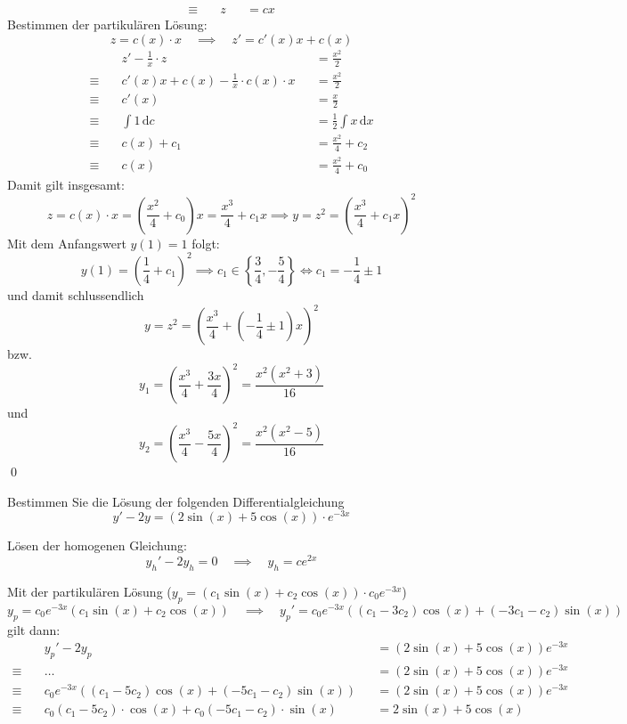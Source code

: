 \documentclass[answers]{exam}
\renewcommand{\d}{\,\mathrm{d}}
\begin{document}
\begin{questions}
\begin{solution}
$$\begin{aligned}
        \equiv \quad & z      &  & = cx
        \end{aligned}
        $$
        Bestimmen der partikulären Lösung: 
        $$
        z = c(x) \cdot x \quad \implies \quad z' = c'(x)x + c(x)
        $$
        $$
        \begin{aligned}
            & z' - \frac{1}{x} \cdot z     &  & = \frac{x^2}{2} \\
            \equiv \quad & c'(x)x + c(x) - \frac{1}{x} \cdot c(x) \cdot x &  & = \frac{x^2}{2} \\
            \equiv \quad & c'(x)  &  & = \frac{x}{2} \\
            \equiv \quad & \int 1 \d c  &  & = \frac{1}{2} \int x \d x\\
            \equiv \quad & c(x) + c_1  &  & = \frac{x^2}{4} + c_2\\
            \equiv \quad & c(x)  &  & = \frac{x^2}{4} + c_0
        \end{aligned}
        $$
        \newpage 
        Damit gilt insgesamt: 
        $$
        z = c(x) \cdot x = \left(\frac{x^2}{4} + c_0\right)x = \frac{x^3}{4} + c_1x \implies y = z^2 = \left(\frac{x^3}{4} + c_1x\right)^2
        $$
        Mit dem Anfangswert $y(1) = 1$ folgt: 
        $$
        y(1) = \left(\frac{1}{4} + c_1\right)^2 \implies c_1 \in \left\{\frac{3}{4}, -\frac{5}{4}\right\} \iff c_1 = -\frac{1}{4} \pm 1 
        $$
        und damit schlussendlich 
        $$
        y = z^2 = \left(\frac{x^3}{4} + \left(-\frac{1}{4} \pm 1\right)x\right)^2 
        $$
        bzw. 
        $$
        y_1 = \left(\frac{x^3}{4} + \frac{3x}{4}\right)^2 = \frac{x^2\left(x^2 + 3\right)}{16} 
        $$
        und 
        $$
        y_2 = \left(\frac{x^3}{4} - \frac{5x}{4}\right)^2 = \frac{x^2\left(x^2 -5\right)}{16} 
        $$\qed
    \end{solution}

    \newpage
    \question
    Bestimmen Sie die Lösung der folgenden Differentialgleichung
    $$
        y' - 2y = (2\sin(x) + 5\cos(x)) \cdot e^{-3x}
    $$
    \begin{solution}
        Lösen der homogenen Gleichung: 
        $$
        y_h' - 2y_h = 0 \quad \implies \quad y_h = ce^{2x}
        $$

        Mit der partikulären Lösung ($y_p = (c_1\sin(x) + c_2\cos(x))\cdot c_0e^{-3x}$)
        $$
        y_p = c_0e^{-3x}(c_1\sin(x) + c_2\cos(x)) \quad \implies \quad y_p' = c_0 e^{-3 x} ((c_1 - 3 c_2) \cos(x) + (-3 c_1 - c_2) \sin(x))
        $$
        gilt dann: 
        $$
        \begin{aligned}
            & y_p' - 2y_p && = (2\sin(x) + 5\cos(x)) e^{-3x} \\
            \equiv \quad & \ldots && = (2\sin(x) + 5\cos(x)) e^{-3x} \\
            \equiv \quad & c_0 e^{-3 x} ((c_1-5c_2)\cos(x) + (-5c_1 -c_2)\sin(x)) && = (2\sin(x) + 5\cos(x)) e^{-3x} \\
            \equiv \quad & c_0(c_1-5c_2) \cdot \cos(x) + c_0(-5c_1 -c_2) \cdot \sin(x) && = 2\sin(x) + 5\cos(x) \\
        \end{aligned}
        $$


\end{solution}
\end{questions}
\end{document}
